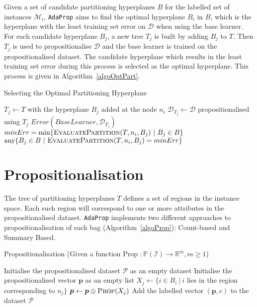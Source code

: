 \documentclass[a4paper,12pt]{report} %
\newcommand{\AdaProp}{\texttt{AdaProp}\xspace}
\newcommand{\real}{\mathbb{R}}
\newcommand{\mcl}[1]{\mathcal{#1}}
\newcommand{\power}{\mathbb{P}}
\newcommand{\vect}[1]{\boldsymbol{#1}}
\begin{document}
Given a set of candidate partitioning hyperplanes $B$ for the labelled set of instances $\mcl{M}_i$, 
    \AdaProp aims to find the optimal hyperplane $B_i$ in $B$, 
    which is the hyperplane with the least
    training set error on $\mcl{D}$ when using the base learner.
For each candidate hyperplane $B_j$,
    a new tree $T_j$ is built by adding $B_j$ to $T$.
Then $T_j$ is used to propositionalise $\mcl{D}$
    and the base learner is trained on the propositionalised dataset.
The candidate hyperplane which results in the least training set 
    error during this process is selected as the 
    optimal hyperplane.
This process is given in Algorithm~\ref{algoOptPart}.

\begin{algorithm}
\caption{Selecting the Optimal Partitioning Hyperplane}
\label{algoOptPart} 
\begin{algorithmic}
    \State $T_j \gets T$ with the hyperplane $B_j$ added at the node $n_i$
        \State $\mcl{D}_{T_j} \gets \mcl{D}$ propositionalised using $T_j$
        \State \Return $Error(BaseLearner,\mcl{D}_{T_j})$
    \EndFunction
    \State 
    \State $minErr = \min \{ \textrm{\sc EvaluatePartition}(T,n_i,B_j) ~|~ B_j \in B \}$
    \State \Return $\textrm{any} \{ B_j \in B ~|~ \textrm{\sc EvaluatePartition}(T,n_i,B_j) = minErr \}$
    \EndFunction
\end{algorithmic}
\end{algorithm}

\section{Propositionalisation}
\label{secProp}

The tree of partitioning hyperplanes $T$ defines a set of regions in the instance space.
Each such region will correspond to one or more attributes 
    in the propositionalised dataset.
\AdaProp implements two different approaches to propositionalisation of each bag
    (Algorithm~\ref{algoProp}):
    Count-based and Summary Based.


\begin{algorithm}
\caption{Propositionalisation (Given a function {\sc Prop} $: \power(\mcl{I}) \to \real^m, m \geq 1$)}
\label{algoProp} 
    \begin{algorithmic}
    \State Initialise the propositionalised dataset $\mcl{P}$ as an empty dataset
    \ForAll{bags $(B_i,c) \in \mcl{D}$}
        \State Initialise the propositionalised vector $\vect{p}$ as an empty list
            \State $X_j \gets \{ i \in B_i ~|~ i$ 
                lies in the region corresponding to $n_j \} $
            \State $\vect{p} \gets \vect{p} \oplus \textrm{\sc Prop}(X_j)$
        \EndFor
        \State Add the labelled vector $(\vect{p},c)$ 
            to the dataset $\mcl{P}$
    \EndFor
    \end{algorithmic}
\end{algorithm}
\end{document}
